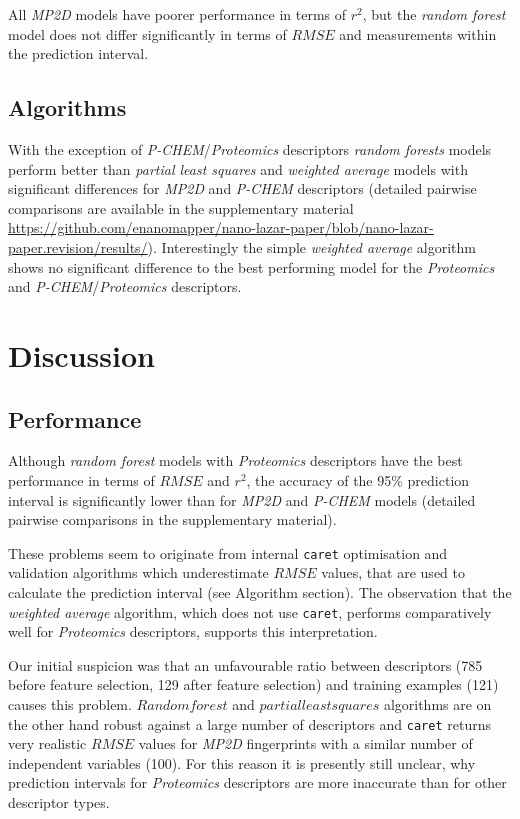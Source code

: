 \documentclass[utf8]{frontiersHLTH} %
\begin{document}
All \emph{MP2D} models have poorer performance in terms of \(r^2\), but
the \emph{random forest} model does not differ significantly in terms of
\(RMSE\) and measurements within the prediction interval.

\subsection{Algorithms}\label{algorithms-1}

With the exception of \emph{P-CHEM}/\emph{Proteomics} descriptors
\emph{random forests} models perform better than \emph{partial least
squares} and \emph{weighted average} models with significant differences
for \emph{MP2D} and \emph{P-CHEM} descriptors (detailed pairwise
comparisons are available in the supplementary material
\url{https://github.com/enanomapper/nano-lazar-paper/blob/nano-lazar-paper.revision/results/}).
Interestingly the simple \emph{weighted average} algorithm shows no
significant difference to the best performing model for the
\emph{Proteomics} and \emph{P-CHEM}/\emph{Proteomics} descriptors.

\section{Discussion}\label{discussion}

\subsection{Performance}\label{performance}

Although \emph{random forest} models with \emph{Proteomics} descriptors
have the best performance in terms of \(RMSE\) and \(r^2\), the accuracy
of the 95\% prediction interval is significantly lower than for
\emph{MP2D} and \emph{P-CHEM} models (detailed pairwise comparisons in
the supplementary material).

These problems seem to originate from internal \texttt{caret}
optimisation and validation algorithms which underestimate \(RMSE\)
values, that are used to calculate the prediction interval (see
Algorithm section). The observation that the \emph{weighted average}
algorithm, which does not use \texttt{caret}, performs comparatively
well for \emph{Proteomics} descriptors, supports this interpretation.

Our initial suspicion was that an unfavourable ratio between descriptors
(785 before feature selection, 129 after feature selection) and training
examples (121) causes this problem. \(Random forest\) and
\(partial least squares\) algorithms are on the other hand robust
against a large number of descriptors and \texttt{caret} returns very
realistic \(RMSE\) values for \emph{MP2D} fingerprints with a similar
number of independent variables (100). For this reason it is presently
still unclear, why prediction intervals for \emph{Proteomics}
descriptors are more inaccurate than for other descriptor types.
\end{document}
